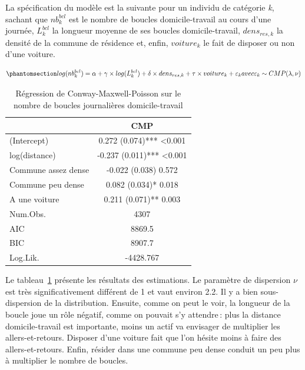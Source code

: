\documentclass[
  9pt,
  a4paper,
  DIV=11]{scrreprt}
\begin{document}
La spécification du modèle est la suivante pour un individu de catégorie
\emph{k}, sachant que \(nb^{bcl}_k\) est le nombre de boucles
domicile-travail au cours d'une journée, \(L^{bcl}_k\) la longueur
moyenne de ses boucles domicile-travail, \(dens_{res,k}\) la densité de
la commune de résidence et, enfin, \(voiture_k\) le fait de disposer ou
non d'une voiture.

\begin{equation}\phantomsection\label{eq-reg-cmp}{
log(nb^{bcl}_k) = \alpha + \gamma \times log(L^{bcl}_k) + \delta \times dens_{res, k} + \tau \times voiture_k + \varepsilon_k \\avec \\ \varepsilon_k \sim CMP(\lambda, \nu)
}\end{equation}

\begin{longtable}{lc}

\caption{\label{tbl-reg-cmp}Régression de Conway-Maxwell-Poisson sur le
nombre de boucles journalières domicile-travail}

\tabularnewline

\toprule
  & CMP \\ 
\midrule\addlinespace[2.5pt]
(Intercept) & 0.272 (0.074)*** <0.001 \\ 
log(distance) & -0.237 (0.011)*** <0.001 \\ 
Commune assez dense & -0.022 (0.038) 0.572 \\ 
Commune peu dense & 0.082 (0.034)* 0.018 \\ 
A une voiture & 0.211 (0.071)** 0.003 \\ 
Num.Obs. & 4307 \\ 
AIC & 8869.5 \\ 
BIC & 8907.7 \\ 
Log.Lik. & -4428.767 \\ 
\bottomrule

\end{longtable}

Le tableau~\ref{tbl-reg-cmp} présente les résultats des estimations. Le
paramètre de dispersion \(\nu\) est très significativement différent de
1 et vaut environ 2.2. Il y a bien sous-dispersion de la distribution.
Ensuite, comme on peut le voir, la longueur de la boucle joue un rôle
négatif, comme on pouvait s'y attendre\,: plus la distance
domicile-travail est importante, moins un actif va envisager de
multiplier les allers-et-retours. Disposer d'une voiture fait que l'on
hésite moins à faire des allers-et-retours. Enfin, résider dans une
commune peu dense conduit un peu plus à multiplier le nombre de boucles.
\end{document}
